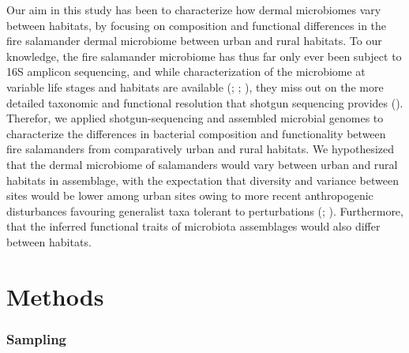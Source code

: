 \documentclass[
  12pt,
]{article}
\begin{document}
Our aim in this study has been to characterize how dermal microbiomes
vary between habitats, by focusing on composition and functional
differences in the fire salamander dermal microbiome between urban and
rural habitats. To our knowledge, the fire salamander microbiome has
thus far only ever been subject to 16S amplicon sequencing, and while
characterization of the microbiome at variable life stages and habitats
are available (; ;
), they miss out
on the more detailed taxonomic and functional resolution that shotgun
sequencing provides
().
Therefor, we applied shotgun-sequencing and assembled microbial genomes
to characterize the differences in bacterial composition and
functionality between fire salamanders from comparatively urban and
rural habitats. We hypothesized that the dermal microbiome of
salamanders would vary between urban and rural habitats in assemblage,
with the expectation that diversity and variance between sites would be
lower among urban sites owing to more recent anthropogenic disturbances
favouring generalist taxa tolerant to perturbations
(;
). Furthermore,
that the inferred functional traits of microbiota assemblages would also
differ between habitats.

\section{Methods}\label{methods}

\subsubsection{Sampling}\label{sampling}
\end{document}
